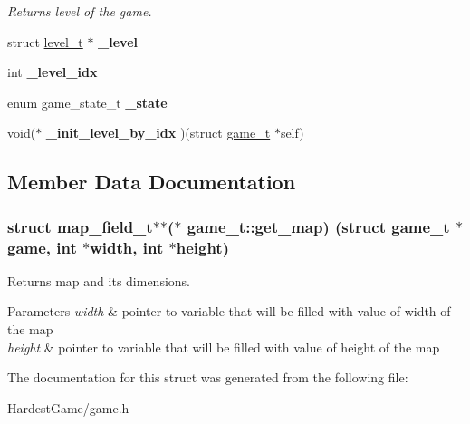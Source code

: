 \begin{DoxyCompactItemize}
\begin{DoxyCompactList}\small\item\em Returns level of the game. \end{DoxyCompactList}\item 
struct \hyperlink{structlevel__t}{level\+\_\+t} $\ast$ {\bfseries \+\_\+level}\hypertarget{structgame__t_a357dd2fe41126434f531d1fd8bd064a7}{}\label{structgame__t_a357dd2fe41126434f531d1fd8bd064a7}

\item 
int {\bfseries \+\_\+level\+\_\+idx}\hypertarget{structgame__t_a3788d1b245b0326eb47c82ab7ab6e6f9}{}\label{structgame__t_a3788d1b245b0326eb47c82ab7ab6e6f9}

\item 
enum game\+\_\+state\+\_\+t {\bfseries \+\_\+state}\hypertarget{structgame__t_a086cad569db999ecae4e3e25778c0ccf}{}\label{structgame__t_a086cad569db999ecae4e3e25778c0ccf}

\item 
void($\ast$ {\bfseries \+\_\+init\+\_\+level\+\_\+by\+\_\+idx} )(struct \hyperlink{structgame__t}{game\+\_\+t} $\ast$self)\hypertarget{structgame__t_ae15cc566b3e1de9680832db2d071ebbd}{}\label{structgame__t_ae15cc566b3e1de9680832db2d071ebbd}

\end{DoxyCompactItemize}


\subsection{Member Data Documentation}
\subsubsection[{\texorpdfstring{get\+\_\+map}{get_map}}]{\setlength{\rightskip}{0pt plus 5cm}struct {\bf map\+\_\+field\+\_\+t}$\ast$$\ast$($\ast$ game\+\_\+t\+::get\+\_\+map) (struct {\bf game\+\_\+t} $\ast$game, int $\ast$width, int $\ast$height)}\hypertarget{structgame__t_a41d009bbe7b429a2657d012b94778c92}{}\label{structgame__t_a41d009bbe7b429a2657d012b94778c92}


Returns map and its dimensions. 


\begin{DoxyParams}{Parameters}
{\em width} & pointer to variable that will be filled with value of width of the map \\
\hline
{\em height} & pointer to variable that will be filled with value of height of the map \\
\hline
\end{DoxyParams}


The documentation for this struct was generated from the following file\+:\begin{DoxyCompactItemize}
\item 
Hardest\+Game/game.\+h\end{DoxyCompactItemize}
